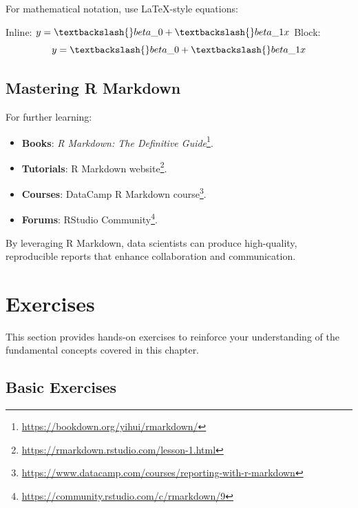 \documentclass[
  11pt,
]{book}
\makeatletter
\newenvironment{Shaded}{}{}
\newcommand{\AnnotationTok}[1]{\textcolor[rgb]{0.36,0.36,0.36}{#1}}
\newcommand{\CommentTok}[1]{\textcolor[rgb]{0.36,0.36,0.36}{#1}}
\providecommand{\tightlist}{%
  \setlength{\itemsep}{0pt}\setlength{\parskip}{0pt}}
\renewcommand{\href}[2]{#2\footnote{\url{#1}}}
\newenvironment{kframe}{%
\medskip{}
\setlength{\fboxsep}{.8em}
 \def\at@end@of@kframe{}%
 \ifinner\ifhmode%
  \def\at@end@of@kframe{\end{minipage}}%
  \begin{minipage}{\columnwidth}%
 \fi\fi%
 \def\FrameCommand##1{\hskip\@totalleftmargin \hskip-\fboxsep
 \colorbox{shadecolor}{##1}\hskip-\fboxsep
     \hskip-\linewidth \hskip-\@totalleftmargin \hskip\columnwidth}%
 \MakeFramed {\advance\hsize-\width
   \@totalleftmargin\z@ \linewidth\hsize
   \@setminipage}}%
 {\par\unskip\endMakeFramed%
 \at@end@of@kframe}
\renewenvironment{Shaded}{\begin{kframe}}{\end{kframe}}
\theoremstyle{definition}
\theoremstyle{definition}
\theoremstyle{definition}
\theoremstyle{definition}
\theoremstyle{remark}
\makeatother
\begin{document}
For mathematical notation, use LaTeX-style equations:

\begin{Shaded}
\begin{Highlighting}[]
\AnnotationTok{Inline:}\CommentTok{ $y = \textbackslash{}beta\_0 + \textbackslash{}beta\_1 x$  }
\AnnotationTok{Block:}\CommentTok{ $$ y = \textbackslash{}beta\_0 + \textbackslash{}beta\_1 x $$}
\end{Highlighting}
\end{Shaded}

\subsection*{Mastering R Markdown}\label{mastering-r-markdown}


For further learning:

\begin{itemize}
\tightlist
\item
  \textbf{Books}: \href{https://bookdown.org/yihui/rmarkdown/}{\emph{R Markdown: The Definitive Guide}}.\\
\item
  \textbf{Tutorials}: \href{https://rmarkdown.rstudio.com/lesson-1.html}{R Markdown website}.\\
\item
  \textbf{Courses}: \href{https://www.datacamp.com/courses/reporting-with-r-markdown}{DataCamp R Markdown course}.\\
\item
  \textbf{Forums}: \href{https://community.rstudio.com/c/rmarkdown/9}{RStudio Community}.
\end{itemize}

By leveraging R Markdown, data scientists can produce high-quality, reproducible reports that enhance collaboration and communication.

\section{Exercises}\label{intro-R-exercises}

This section provides hands-on exercises to reinforce your understanding of the fundamental concepts covered in this chapter.

\subsection*{Basic Exercises}\label{basic-exercises}
\end{document}
